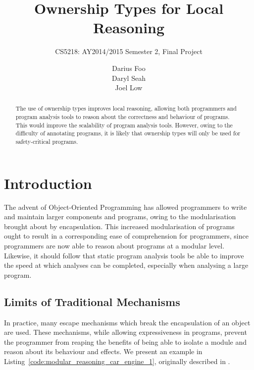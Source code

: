 \documentclass{acm_proc_article-sp}
\begin{document}
\title{Ownership Types for Local Reasoning}
\subtitle{CS5218: AY2014/2015 Semester 2, Final Project}


\author{
\alignauthor
Darius Foo\\
\alignauthor
Daryl Seah\\
\alignauthor
Joel Low\\
}



\maketitle
\begin{abstract}
The use of ownership types improves local reasoning, allowing both programmers 
and program analysis tools to reason about the correctness and behaviour of 
programs. This would improve the scalability of program analysis tools. 
However, owing to the difficulty of annotating programs, it is likely that 
ownership types will only be used for safety-critical programs.
\end{abstract}

\section{Introduction}
\label{sec:intro}

The advent of Object-Oriented Programming has allowed programmers to write and 
maintain larger components and programs, owing to the modularisation brought 
about by encapsulation. This increased modularisation of programs ought to 
result in a corresponding ease of comprehension for programmers, since 
programmers are now able to reason about programs at a modular level. 
Likewise, it should follow that static program analysis tools be able to 
improve the speed at which analyses can be completed, especially when analysing 
a large program.

\subsection{Limits of Traditional Mechanisms}
In practice, many escape mechanisms which break the encapsulation of an object 
are used. These mechanisms, while allowing expressiveness in programs, prevent 
the programmer from reaping the benefits of being able to isolate a module and 
reason about its behaviour and effects. We present an example in 
Listing~\ref{code:modular_reasoning_car_engine_1}, originally 
described in \cite{clarke98ownership}.
\end{document}

